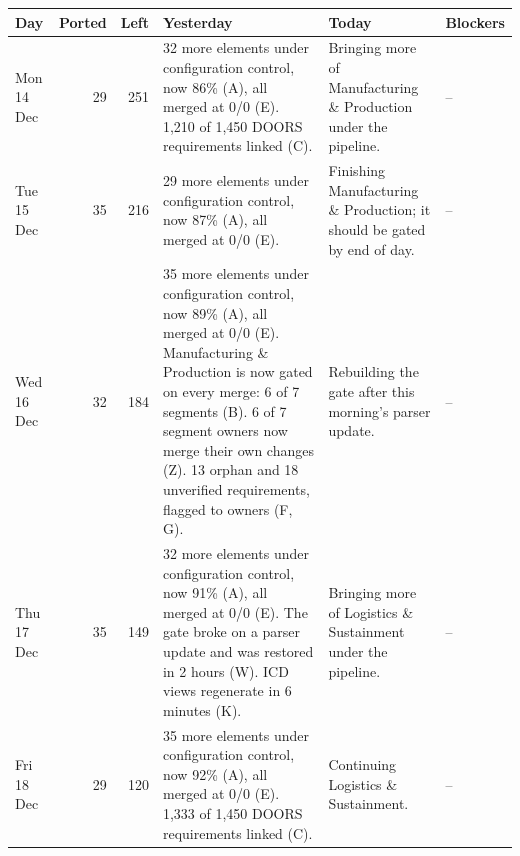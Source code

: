 \documentclass[12pt,letterpaper,oneside]{article}
\newcommand{\figfont}{\fontsize{9}{11}\selectfont}   %
\begin{document}
\begin{center}
\end{center}
{\figfont\setlength{\tabcolsep}{4pt}\renewcommand{\arraystretch}{1.15}
\begin{longtable}{@{}>{\raggedright}p{} r r >{\raggedright}p{} >{\raggedright}p{} >{\raggedright\arraybackslash}p{}@{}}
\toprule
Day & Ported & Left & Yesterday & Today & Blockers \\
\midrule
\endhead
\bottomrule
\endfoot
Mon 14 Dec & 29 & 251 & 32 more elements under configuration control, now 86\% (A), all merged at 0/0 (E). 1,210 of 1,450 DOORS requirements linked (C). & Bringing more of Manufacturing \& Production under the pipeline. & -- \\
Tue 15 Dec & 35 & 216 & 29 more elements under configuration control, now 87\% (A), all merged at 0/0 (E). & Finishing Manufacturing \& Production; it should be gated by end of day. & -- \\
Wed 16 Dec & 32 & 184 & 35 more elements under configuration control, now 89\% (A), all merged at 0/0 (E). Manufacturing \& Production is now gated on every merge: 6 of 7 segments (B). 6 of 7 segment owners now merge their own changes (Z). 13 orphan and 18 unverified requirements, flagged to owners (F, G). & Rebuilding the gate after this morning's parser update. & -- \\
Thu 17 Dec & 35 & 149 & 32 more elements under configuration control, now 91\% (A), all merged at 0/0 (E). The gate broke on a parser update and was restored in 2 hours (W). ICD views regenerate in 6 minutes (K). & Bringing more of Logistics \& Sustainment under the pipeline. & -- \\
Fri 18 Dec & 29 & 120 & 35 more elements under configuration control, now 92\% (A), all merged at 0/0 (E). 1,333 of 1,450 DOORS requirements linked (C). & Continuing Logistics \& Sustainment. & -- \\

\end{longtable}}
\end{document}

